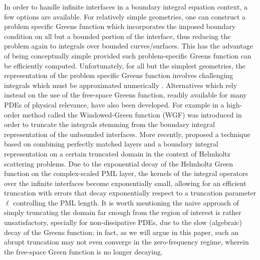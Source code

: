 \documentclass[11pt]{article}
\begin{document}
In order to handle infinite interfaces in a boundary integral equation context,
a few options are available. For relatively simple geometries, one can construct
a problem specific Greens function which incorporates the imposed boundary
condition on all but a bounded portion of the interface, thus reducing the
problem again to integrals over bounded curves/surfaces. This has the advantage
of being conceptually simple provided such problem-specific Greens function can
be efficiently computed. Unfortunately, for all but the simplest geometries, the
representation of the problem specific Greens function involves challenging
integrals which must be approximated numerically \cite{}. Alternatives which
rely instead on the use of the free-space Greens function, readily available for
many PDEs of physical relevance, have also been developed. For example in
\cite{bruno2016windowed} a high-order method called the Windowed-Green function
(WGF) was introduced in order to truncate the integrals stemming from the
boundary integral representation of the unbounded interfaces. More recently,
\cite{lu2018perfectly} proposed a technique based on combining perfectly matched
layers and a boundary integral representation on a certain truncated domain in
the context of Helmholtz scattering problems. Due to the exponential decay of
the Helmholtz Green function on the complex-scaled PML layer, the kernels of the
integral operators over the infinite interfaces become exponentially small,
allowing for an efficient truncation with errors that decay exponentially
respect to a truncation parameter $\ell$ controlling the PML length. It is worth
mentioning the naive approach of simply truncating the domain far enough from
the region of interest is rather unsatisfactory, specially for non-dissipative
PDEs, due to the slow (algebraic) decay of the Greens function; in fact, as we
will argue in this paper, such an abrupt truncation may not even converge in the
zero-frequency regime, wherein the free-space Green function is no longer
decaying.
\end{document}
